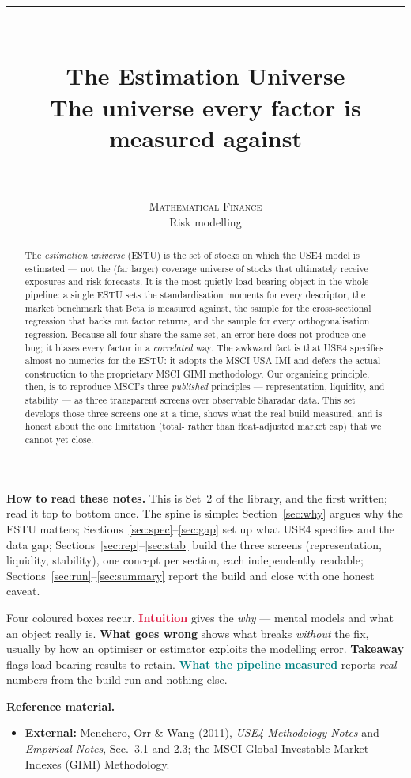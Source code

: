\documentclass[11pt]{article}
\title{\vspace{-2.2em}
  {\color{steel}\rule{\textwidth}{1.3pt}}\\[0.7em]
  \Huge\bfseries The Estimation Universe\\[0.35em]
  \large\mdseries The universe every factor is measured against\\[0.4em]
  {\color{steel}\rule{\textwidth}{0.7pt}}}
\author{\textsc{Mathematical Finance}\\[0.2em]
  \small Risk modelling}
\date{}
\theoremstyle{definition}
\theoremstyle{plain}
\theoremstyle{remark}
\begin{document}
\maketitle
\thispagestyle{empty}

\begin{abstract}
The \emph{estimation universe} (ESTU) is the set of stocks on which the USE4 model is estimated --- not the (far larger) coverage universe of stocks that ultimately receive exposures and risk forecasts. It is the most quietly load-bearing object in the whole pipeline: a single ESTU sets the standardisation moments for every descriptor, the market benchmark that Beta is measured against, the sample for the cross-sectional regression that backs out factor returns, and the sample for every orthogonalisation regression. Because all four share the same set, an error here does not produce one bug; it biases every factor in a \emph{correlated} way. The awkward fact is that USE4 specifies almost no numerics for the ESTU: it adopts the MSCI USA IMI and defers the actual construction to the proprietary MSCI GIMI methodology. Our organising principle, then, is to reproduce MSCI's three \emph{published} principles --- representation, liquidity, and stability --- as three transparent screens over observable Sharadar data. This set develops those three screens one at a time, shows what the real build measured, and is honest about the one limitation (total- rather than float-adjusted market cap) that we cannot yet close.
\end{abstract}

\begin{tcolorbox}[colback=paperlt,colframe=ink!30,boxrule=0.4pt,arc=2pt,left=10pt,right=10pt,top=8pt,bottom=8pt]
\textbf{How to read these notes.} This is Set~2 of the library, and the first written; read it top to bottom once. The spine is simple: Section~\ref{sec:why} argues why the ESTU matters; Sections~\ref{sec:spec}--\ref{sec:gap} set up what USE4 specifies and the data gap; Sections~\ref{sec:rep}--\ref{sec:stab} build the three screens (representation, liquidity, stability), one concept per section, each independently readable; Sections~\ref{sec:run}--\ref{sec:summary} report the build and close with one honest caveat.

Four coloured boxes recur. \textcolor{crimson}{\textbf{Intuition}} gives the \emph{why} --- mental models and what an object really is. \textcolor{amber}{\textbf{What goes wrong}} shows what breaks \emph{without} the fix, usually by how an optimiser or estimator exploits the modelling error. \textcolor{steel}{\textbf{Takeaway}} flags load-bearing results to retain. \textcolor{teal}{\textbf{What the pipeline measured}} reports \emph{real} numbers from the build run and nothing else.

\textbf{Reference material.}
\begin{itemize}[nosep,leftmargin=1.4em]
  \item \textbf{External:} Menchero, Orr \& Wang (2011), \emph{USE4 Methodology Notes} and \emph{Empirical Notes}, Sec.\ 3.1 and 2.3; the MSCI Global Investable Market Indexes (GIMI) Methodology.
\end{itemize}
\end{tcolorbox}
\end{document}

